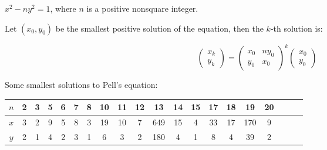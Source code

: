 $x^2 - ny^2 = 1$, where $n$ is a positive nonsquare integer.

Let $(x_0, y_0)$ be the smallest positive solution of the equation, then the $k$-th solution is:

\begin{equation*}
\begin{pmatrix}x_k \\ y_k\end{pmatrix} =
\begin{pmatrix}
  x_0 & ny_0 \\
  y_0 & x_0
\end{pmatrix} ^k
\begin{pmatrix}x_0 \\ y_0\end{pmatrix}
\end{equation*}

Some smallest solutions to Pell's equation:

  \begin{tabular}{|c|c|c|c|c|c|c|c|c|c|c|c|c|c|c|c|c|c|c|c|}
  \hline
  $n$ & 2 & 3 & 5 & 6 & 7 & 8 & 10 & 11 & 12 & 13  & 14 & 15 & 17 & 18 & 19 & 20 \\ \hline
  $x$ & 3 & 2 & 9 & 5 & 8 & 3 & 19 & 10 & 7  & 649 & 15 & 4 & 33 & 17 & 170 & 9 \\ \hline
  $y$ & 2 & 1 & 4 & 2 & 3 & 1 & 6  & 3  & 2  & 180 & 4  & 1 & 8 & 4 & 39 & 2 \\ \hline
  \end{tabular}
